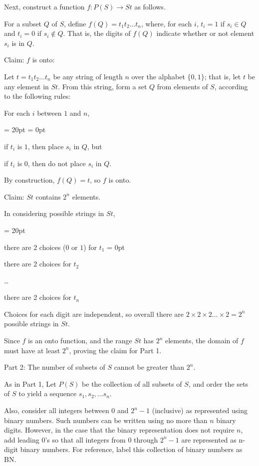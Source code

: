 Next, construct a function $f: P(S) \to St$ as follows.

For a subset $Q$ of $S$, define $f(Q) = t_1 t_2 \dots t_n$, where, for each $i$,
$t_i = 1$ if $s_i \in Q$ and $t_i = 0$ if $s_i \not\in Q$.  That is, the digits of $f(Q)$ indicate whether or not element $s_i$ is in $Q$.

{\ital Claim:  $f$ is onto:}

Let $t = t_1 t_2 \dots t_n$ be any string of length $n$ over the alphabet $\{0, 1\}$; that is, let $t$ be any element in $St$.  From this string, form a set $Q$ from elements of $S$, according to the following rules:

For each $i$ between $1$ and $n$, 

{\parindent = 20pt
\parskip = 0pt
\item {} if $t_i$ is $1$, then place $s_i$ in $Q$, but 
\item {} if $t_i$ is $0$, then do not place $s_i$ in $Q$.

}

By construction, $f(Q) = t$, so $f$ is onto.

{\ital Claim:} $St$ contains $2^n$ elements.

In considering possible strings in $St$, 

{\parindent = 20pt
\item {} there are 2 choices ($0$ or $1$) for $t_1$
\parskip = 0pt

\item {} there are 2 choices for $t_2$
\item {} \dots
\item {} there are 2 choices for $t_n$

}

Choices for each digit are independent, so overall there are 
$2 \times 2 \times 2 \dots  \times 2 = 2^n$ possible strings in $St$.

Since $f$ is an onto function, and the range $St$ has $2^n$ elements, the domain of $f$ must have at least $2^n$, proving the claim for Part 1.


{\ital Part 2:  The number of subsets of $S$ cannot be greater than $2^n$.}

As in Part 1, Let $P(S)$ be the collection of all subsets of $S$, and \hfil\break
order the sets of $S$ to yield a sequence $s_1, s_2, \dots s_n$.

Also, consider all integers between $0$ and $2^n-1$ (inclusive) as represented using binary numbers.  Such numbers can be written using no more than $n$ binary digits.  However, in the case that the binary representation does not require $n$, add leading $0$'s so that all integers from $0$ through $2^n-1$ are represented as n-digit binary numbers.  For reference, label this collection of binary numbers as BN.

